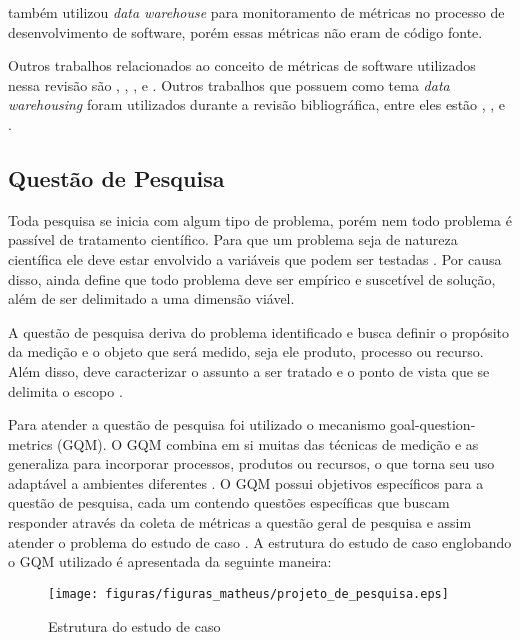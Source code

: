 também utilizou \textit{data warehouse} para monitoramento de métricas no processo de desenvolvimento de software, porém essas métricas não eram de código fonte.

Outros trabalhos relacionados ao conceito de métricas de software utilizados nessa revisão são , , ,  e . Outros trabalhos que possuem como tema \textit{data warehousing} foram utilizados durante a revisão bibliográfica, entre eles estão  , ,  e . 



\subsection{Questão de Pesquisa}

Toda pesquisa se inicia com algum tipo de problema, porém nem todo problema é passível de tratamento científico. Para que um problema seja de natureza científica ele deve estar envolvido a variáveis que podem ser testadas \cite{gil_como_2002}. Por causa disso,  ainda define que todo problema deve ser empírico e suscetível de solução, além de ser delimitado a uma dimensão viável.

A questão de pesquisa deriva do problema identificado e busca definir o propósito da medição e o objeto que será medido, seja ele produto, processo ou recurso. Além disso, deve caracterizar o assunto a ser tratado e o ponto de vista que se delimita o escopo \cite{Basili96b} \cite{caldiera_goal_1994}.

Para atender a questão de pesquisa foi utilizado o mecanismo goal-question-metrics (GQM). O GQM combina em si muitas das técnicas de medição e as generaliza para incorporar processos, produtos ou recursos, o que torna seu uso adaptável a ambientes diferentes \cite{caldiera_goal_1994}. O GQM possui objetivos específicos para a questão de pesquisa, cada um contendo questões específicas que buscam responder através da coleta de métricas a questão geral de pesquisa e assim atender o problema do estudo de caso \cite{Basili96b}. A estrutura do estudo de caso englobando o GQM utilizado é apresentada da seguinte maneira:  

\begin{figure}[h!]
\centering
\texttt{[image: figuras/figuras\_matheus/projeto\_de\_pesquisa.eps]}
\caption{Estrutura do estudo de caso}
\label{fig:pesquisa}
\end{figure}
\FloatBarrier

